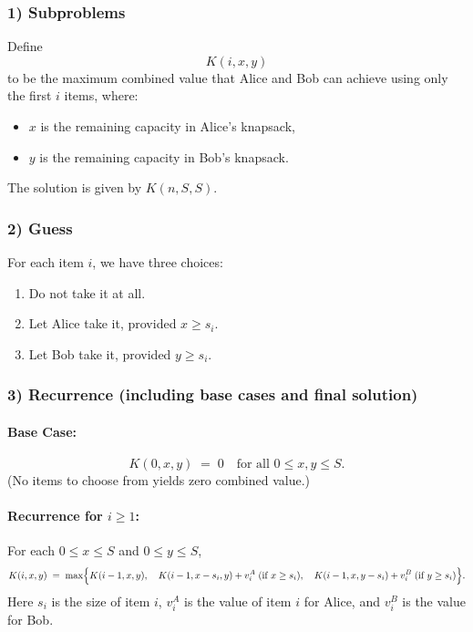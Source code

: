 \documentclass[11pt]{article}
\begin{document}
    \subsubsection*{1) Subproblems}
    
    Define 
    \[
    K(i, x, y)
    \]
    to be the maximum combined value that Alice and Bob can achieve using only the first \(i\) items, where:
    \begin{itemize}
        \item \(x\) is the remaining capacity in Alice's knapsack,
        \item \(y\) is the remaining capacity in Bob's knapsack.
    \end{itemize}
    The solution is given by \( K(n, S, S)\).
    
    \subsubsection*{2) Guess}
    
    For each item \(i\), we have three choices:
    \begin{enumerate}
        \item Do not take it at all.
        \item Let Alice take it, provided \(x \ge s_i\).
        \item Let Bob take it, provided \(y \ge s_i\).
    \end{enumerate}
    
    \subsubsection*{3) Recurrence (including base cases and final solution)}
    \paragraph{Base Case:}
    \[
    K(0, x, y) \;=\; 0 \quad \text{for all } 0 \le x,y \le S.
    \]
    (No items to choose from yields zero combined value.)
    
    \paragraph{Recurrence for \(i \ge 1\):}
    For each \(0 \le x \le S\) and \(0 \le y \le S\),
    \[
    K(i, x, y)
    \;=\;
    \max \Bigl\{
        K(i-1, x, y),\quad
        K(i-1, x - s_i, y) + v_i^A \;(\text{if } x \ge s_i),\quad
        K(i-1, x, y - s_i) + v_i^B \;(\text{if } y \ge s_i)
    \Bigr\}.
    \]
    Here \(s_i\) is the size of item \(i\), \(v_i^A\) is the value of item \(i\) for Alice, and \(v_i^B\) is the value for Bob.
    
\end{document}
